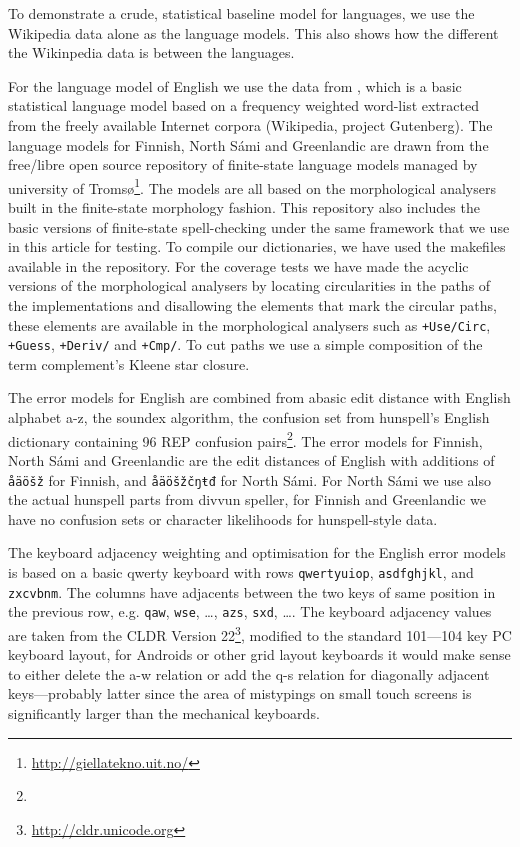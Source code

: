\documentclass[a4paper,12pt]{article}
\begin{document}
To demonstrate a crude, statistical baseline model for languages, we use the
Wikipedia data alone as the language models. This also shows how the different
the Wikinpedia data is between the languages.

For the language model of English we use the data from
\cite{norvig/2010,pirinen2012effects}, which is a basic statistical language
model based on a frequency weighted word-list extracted from the freely
available Internet corpora (Wikipedia, project Gutenberg).  The language models
for Finnish, North Sámi and Greenlandic are drawn from the free/libre open
source repository of finite-state language models managed by university of
Tromsø\footnote{\url{http://giellatekno.uit.no/}}. The
models are all based on the morphological analysers built in the finite-state
morphology \cite[]{beesley2003finite} fashion. This repository also includes
the basic versions of finite-state spell-checking under the same framework that
we use in this article for testing. To compile our dictionaries, we have used
the makefiles available in the repository.  For the coverage tests we have made
the acyclic versions of the morphological analysers by locating circularities
in the paths of the implementations and disallowing the elements that mark the
circular paths, these elements are available in the morphological analysers
such as \texttt{+Use/Circ}, \texttt{+Guess}, \texttt{+Deriv/} and
\texttt{+Cmp/}. To cut paths we use a simple composition of the term
complement's Kleene star closure.

The error models for English are combined from abasic edit distance with English
alphabet a-z, the soundex algorithm, the confusion set from hunspell's English
dictionary containing 96 REP confusion pairs\footnote{}.
The error models for Finnish, North Sámi and Greenlandic are the edit distances
of English with additions of \texttt{åäöšž} for Finnish, and \texttt{åäöšžčŋŧđ}
for North Sámi. For North Sámi we use also the actual hunspell parts from
divvun speller, for Finnish and Greenlandic we have no confusion sets or
character likelihoods for hunspell-style data.

The keyboard adjacency weighting and optimisation for the English error models is
based on a basic qwerty keyboard with rows \texttt{qwertyuiop},
\texttt{asdfghjkl}, and \texttt{zxcvbnm}. The columns have adjacents between
the two keys of same position in the previous row, e.g. \texttt{qaw},
\texttt{wse}, \ldots, \texttt{azs}, \texttt{sxd}, \ldots.  The keyboard
adjacency values are taken from the CLDR Version
22\footnote{\url{http://cldr.unicode.org}}, modified to the standard 101---104
key PC keyboard layout, for Androids or other grid layout keyboards it would
make sense to either delete the a-w relation or add the q-s relation for diagonally
adjacent keys---probably latter since the area of mistypings on small touch
screens is significantly larger than the mechanical keyboards.
\end{document}
